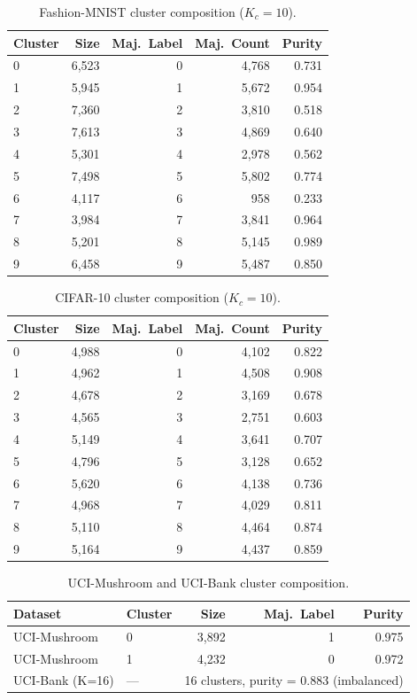 \documentclass{article}
\begin{document}
\begin{table}[h]
\centering
\caption{Fashion-MNIST cluster composition ($K_c\!=\!10$).}
\label{tab:fashion_clusters}
\small
\begin{tabular}{lrrrr}
\toprule
\textbf{Cluster} & \textbf{Size} & \textbf{Maj.~Label} & \textbf{Maj.~Count} & \textbf{Purity} \\
\midrule
0 & 6,523 & 0 & 4,768 & 0.731 \\
1 & 5,945 & 1 & 5,672 & 0.954 \\
2 & 7,360 & 2 & 3,810 & 0.518 \\
3 & 7,613 & 3 & 4,869 & 0.640 \\
4 & 5,301 & 4 & 2,978 & 0.562 \\
5 & 7,498 & 5 & 5,802 & 0.774 \\
6 & 4,117 & 6 &   958 & 0.233 \\
7 & 3,984 & 7 & 3,841 & 0.964 \\
8 & 5,201 & 8 & 5,145 & 0.989 \\
9 & 6,458 & 9 & 5,487 & 0.850 \\
\bottomrule
\end{tabular}
\end{table}

\begin{table}[h]
\centering
\caption{CIFAR-10 cluster composition ($K_c\!=\!10$).}
\label{tab:cifar_clusters}
\small
\begin{tabular}{lrrrr}
\toprule
\textbf{Cluster} & \textbf{Size} & \textbf{Maj.~Label} & \textbf{Maj.~Count} & \textbf{Purity} \\
\midrule
0 & 4,988 & 0 & 4,102 & 0.822 \\
1 & 4,962 & 1 & 4,508 & 0.908 \\
2 & 4,678 & 2 & 3,169 & 0.678 \\
3 & 4,565 & 3 & 2,751 & 0.603 \\
4 & 5,149 & 4 & 3,641 & 0.707 \\
5 & 4,796 & 5 & 3,128 & 0.652 \\
6 & 5,620 & 6 & 4,138 & 0.736 \\
7 & 4,968 & 7 & 4,029 & 0.811 \\
8 & 5,110 & 8 & 4,464 & 0.874 \\
9 & 5,164 & 9 & 4,437 & 0.859 \\
\bottomrule
\end{tabular}
\end{table}

\begin{table}[h]
\centering
\caption{UCI-Mushroom and UCI-Bank cluster composition.}
\label{tab:binary_clusters}
\small
\begin{tabular}{llrrr}
\toprule
\textbf{Dataset} & \textbf{Cluster} & \textbf{Size} & \textbf{Maj.~Label} & \textbf{Purity} \\
\midrule
UCI-Mushroom & 0 & 3,892 & 1 & 0.975 \\
UCI-Mushroom & 1 & 4,232 & 0 & 0.972 \\
\midrule
UCI-Bank (K=16) & --- & \multicolumn{3}{c}{16 clusters, purity = 0.883 (imbalanced)} \\
\bottomrule
\end{tabular}
\end{table}
\end{document}
